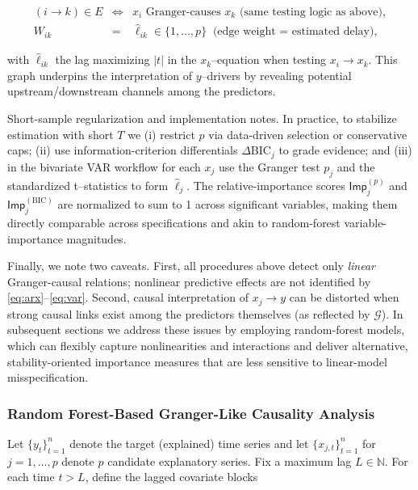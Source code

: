 \documentclass[preprint, 3p,
authoryear]{elsarticle} %
\begin{document}
\begin{eqnarray}
(i\to k)\in E &\Longleftrightarrow& \text{$x_i$ Granger-causes $x_k$ (same testing logic as above)},\\
W_{ik} &=& \widehat{\ell}_{ik}\in\{1,\dots,p\}\;\;\text{(edge weight = estimated delay)},
\end{eqnarray}

\noindent with \(\widehat{\ell}_{ik}\) the lag maximizing \(|t|\) in the
\(x_k\)--equation when testing \(x_i \to x_k\). This graph underpins the
interpretation of \(y\)--drivers by revealing potential
upstream/downstream channels among the predictors.

Short-sample regularization and implementation notes. In practice, to
stabilize estimation with short \(T\) we (i) restrict \(p\) via
data-driven selection or conservative caps; (ii) use
information-criterion differentials \(\Delta\mathrm{BIC}_j\) to grade
evidence; and (iii) in the bivariate VAR workflow for each \(x_j\) use
the Granger test \(p_j\) and the standardized t--statistics to form
\(\widehat{\ell}_j\). The relative-importance scores
\(\mathsf{Imp}^{(p)}_j\) and \(\mathsf{Imp}^{(\mathrm{BIC})}_j\) are
normalized to sum to 1 across significant variables, making them
directly comparable across specifications and akin to random-forest
variable-importance magnitudes.

Finally, we note two caveats. First, all procedures above detect only
\emph{linear} Granger-causal relations; nonlinear predictive effects are
not identified by \eqref{eq:arx}--\eqref{eq:var}. Second, causal
interpretation of \(x_j \to y\) can be distorted when strong causal
links exist among the predictors themselves (as reflected by
\(\mathcal{G}\)). In subsequent sections we address these issues by
employing random-forest models, which can flexibly capture
nonlinearities and interactions and deliver alternative,
stability-oriented importance measures that are less sensitive to
linear-model misspecification.

\subsubsection{Random Forest-Based Granger-Like Causality
Analysis}\label{sec:rfgc}

Let \(\{y_t\}_{t=1}^n\) denote the target (explained) time series and
let \(\{x_{j,t}\}_{t=1}^n\) for \(j=1,\dots,p\) denote \(p\) candidate
explanatory series. Fix a maximum lag \(L\in\mathbb{N}\). For each time
\(t>L\), define the lagged covariate blocks
\end{document}
